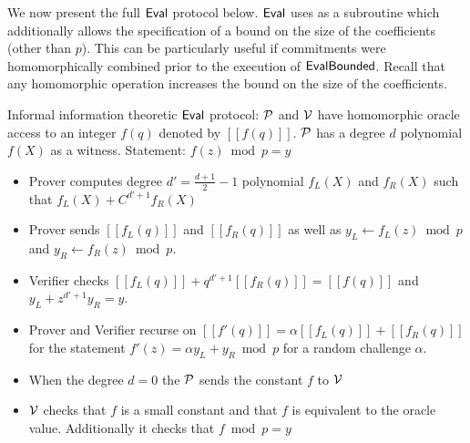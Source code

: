 \documentclass{article}
\theoremstyle{definition}
\begin{document}
We now present the full $\textsf{{Eval}}$ protocol below. $\textsf{{Eval}}$ uses as a subroutine  which additionally allows the specification of a bound on the size of the coefficients (other than $p$).  This can be particularly useful if commitments were homomorphically combined prior to the execution of $\textsf{{EvalBounded}}$. Recall that any homomorphic operation increases the bound on the size of the coefficients.

\begin{mdframed}
Informal information theoretic $\textsf{{Eval}}$ protocol: $\mathcal{P}$ and $\mathcal{V}$ have homomorphic oracle access to an integer $f(q)$ denoted by $[[f(q)]]$. $\mathcal{P}$  has a degree $d$ polynomial $f(X)$ as a witness. Statement: $f(z)\bmod p=y$
	\begin{itemize}[nolistsep]
		\item Prover computes degree $d'=\frac{d+1}{2}-1$ polynomial $f_L(X)$ and $f_R(X)$ such that $f_L(X)+C^{d'+1}f_R(X)$
		\item Prover sends $[[f_L(q)]]$ and $[[f_R(q)]]$ as well as $y_L\gets f_L(z)\bmod p$ and $y_R\gets f_R(z)\bmod p$.
		\item Verifier checks $[[f_L(q)]]+q^{d'+1}[[f_R(q)]]=[[f(q)]]$ and $y_L+z^{d'+1} y_R =y$.
		\item Prover and Verifier recurse on $[[f'(q)]]=\alpha [[f_L(q)]]+[[f_R(q)]]$ for the statement $f'(z)=\alpha y_L +y_R \bmod p$ for a random challenge $\alpha$.
		\item When the degree $d=0$ the $\mathcal{P}$ sends the constant $f$ to $\mathcal{V}$
		\item $\mathcal{V}$ checks that $f$ is a small constant and that $f$ is equivalent to the oracle value. Additionally it checks that $f\bmod p =y$
	\end{itemize}
\end{mdframed}
\end{document}
